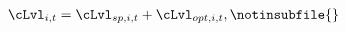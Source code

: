 \begin{align}
  \cLvl_{i,t} &= \cLvl_{sp,i,t} + \cLvl_{opt,i,t}, \notinsubfile{\label{eq:model}}
\end{align}
